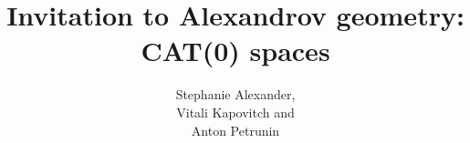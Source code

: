 \frontmatter
\title{Invitation to Alexandrov geometry: CAT(0) spaces}
\author{Stephanie Alexander,\\ Vitali Kapovitch and\\ Anton Petrunin}
\date{}
\maketitle
\thispagestyle{empty}
\newpage
\tableofcontents







{\small

}
